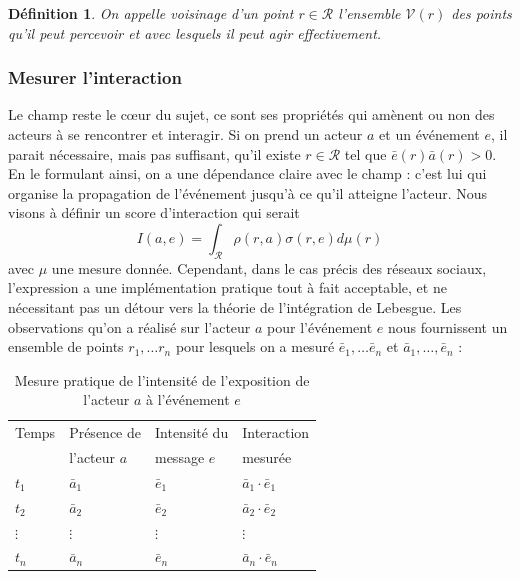 \documentclass[11pt]{article}
\newtheorem{definition}{Définition}[section]
\begin{document}
				\begin{definition}
					On appelle voisinage d'un point $r \in \mathcal{R}$ l'ensemble $\mathcal{V}(r)$ des points qu'il peut percevoir et avec lesquels il peut agir effectivement. 
				\end{definition}
			
			\subsubsection*{Mesurer l'interaction}
			
				Le champ reste le cœur du sujet, ce sont ses propriétés qui amènent ou non des acteurs à se rencontrer et interagir. Si on prend un acteur $a$ et un événement $e$, il parait nécessaire, mais pas suffisant, qu'il existe $r \in \mathcal{R}$ tel que $\bar{e}(r)\bar{a}(r) > 0$. En le formulant ainsi, on a une dépendance claire avec le champ :  c'est lui qui organise la propagation de l'événement jusqu'à ce qu'il atteigne l'acteur. Nous visons à définir un score d'interaction qui serait $$I(a,e) = \int_{\mathcal{R}}\rho(r,a)\sigma(r,e)d\mu(r)$$ avec $\mu$ une mesure donnée. Cependant, dans le cas précis des réseaux sociaux, l'expression a une implémentation pratique tout à fait acceptable, et ne nécessitant pas un détour vers la théorie de l'intégration de Lebesgue. Les observations qu'on a réalisé sur l'acteur $a$ pour l'événement $e$ nous fournissent un ensemble de points $r_1,\ldots r_n$ pour lesquels on a mesuré $\bar{e}_1, \ldots \bar{e}_n$ et $\bar{a}_1,\ldots,\bar{e}_n$ : 
				\begin{table}[H]
					\centering
					\begin{tabular}{|l|l|l|l|}
						\hline 
						Temps & Présence de & Intensité du & Interaction \\
						&  l'acteur $a$ & message $e$ & mesurée \\
						\hline 
						$t_1$ & $\bar{a}_1$ & $\bar{e}_1$ & $\bar{a}_1 \cdot \bar{e}_1$ \\
						\hline 
						$t_2$ & $\bar{a}_2$ & $\bar{e}_2$ & $\bar{a}_2 \cdot \bar{e}_2$ \\
						\hline 
						$\vdots$ & $\vdots$ & $\vdots$ & $\vdots$ \\
						\hline 
						$t_n$ & $\bar{a}_n$ & $\bar{e}_n$ & $\bar{a}_n \cdot \bar{e}_n$ \\
						\hline 
					\end{tabular}
					\caption{Mesure pratique de l'intensité de l'exposition de l'acteur $a$ à l'événement $e$}
				\end{table}
				
\end{document}
